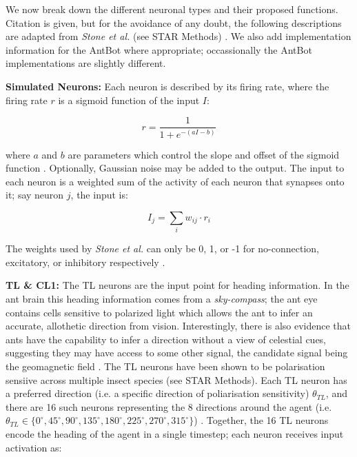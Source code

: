 \documentclass[a4paper,11pt,twoside,openright]{article}
\begin{document}
We now break down the different neuronal types and their proposed functions.
Citation is given, but for the avoidance of any doubt, the following descriptions
are adapted from \textit{Stone et al.} (see STAR Methods) \cite{Stone2017}.
We also add implementation information for the AntBot where appropriate;
occassionally the AntBot implementations are slightly different.
\newline
\par

\textbf{Simulated Neurons:}
Each neuron is described by its firing rate, where the firing rate $r$ is
a sigmoid function of the input $I$:

\begin{equation}
r = \frac{1}{1 + e^{-(aI - b)}}
\end{equation}

where $a$ and $b$ are parameters which control the slope and offset of the
sigmoid function \cite{Stone2017}. Optionally, Gaussian noise may be added
to the output. The input to each neuron is a weighted sum of the activity
of each neuron that synapses onto it; say neuron $j$, the input is:

\begin{equation}
  I_j = \sum_{i} w_{ij} \cdot r_i
\end{equation}

The weights used by \textit{Stone et al.} can only be 0, 1, or -1 for
no-connection, excitatory, or inhibitory respectively \cite{Stone2017}.
\newline
\par

\textbf{TL \& CL1:}
The TL neurons are the input point for heading information. In the ant brain
this heading information comes from a \textit{sky-compass}; the ant eye contains
cells sensitive to polarized light which allows the ant to infer an accurate,
allothetic direction from vision. Interestingly, there is also evidence that ants
have the capability to infer a direction without a view of celestial cues,
suggesting they may have access to some other signal, the candidate signal being
the geomagnetic field \cite{Fleischmann2018, Grob2017}. The TL neurons have been
shown to be polarisation sensiive across multiple insect species \cite{Stone2017}
(see STAR Methods). Each TL neuron has a preferred direction (i.e. a specific
direction of poliarisation sensitivity) $\theta_{TL} $, and there are 16 such
neurons representing the 8 directions around the agent (i.e.
$\theta_{TL} \in \{ 0^{\circ}, 45^{\circ}, 90^{\circ}, 135^{\circ}, 180^{\circ},
225^{\circ}, 270^{\circ}, 315^{\circ}\} $) \cite{Stone2017}. Together, the 16
TL neurons encode the heading of the agent in a single timestep; each neuron
receives input activation as:
\end{document}
